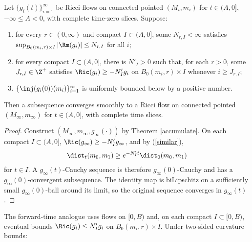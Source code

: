 \begin{corollary}
  \label{cor:kl-convergent-subsequences-ricci-flow-solutions-existence-convergent-subsequences-ricci-flow-solutions}
\label{accumulate2}

Let $\{g_i(t)\}_{i=1}^\infty$ be Ricci flows on connected pointed
$(M_i,m_i)$ for $t\in(A,0]$, $-\infty\leq A<0$, with complete time-zero
slices. Suppose:
\begin{enumerate}
\item for every $r\in(0,\infty)$ and compact $I\subset(A,0]$, some
$N_{r,I}<\infty$ satisfies
$\sup_{B_0(m_i,r)\times I}|\Rm(g_i)|\leq N_{r,I}$ for all $i$;
\item for every compact $I\subset(A,0]$, there is $N'_I>0$ such that, for
each $r>0$, some $J_{r,I}\in\Z^+$ satisfies
$\Ric(g_i)\geq-N'_Ig_i$ on $B_0(m_i,r)\times I$ whenever $i\geq J_{r,I}$;
\item $\{\inj(g_i(0))(m_i)\}_{i=1}^\infty$ is uniformly bounded below by a
positive number.
\end{enumerate}
Then a subsequence converges smoothly to a Ricci flow on connected pointed
$(M_\infty,m_\infty)$ for $t\in(A,0]$, with complete time slices.
\end{corollary}
\begin{proof}
\sketch
Construct $(M_\infty,m_\infty,g_\infty(\cdot))$ by Theorem
\ref{accumulate}. On each compact $I\subset(A,0]$,
$\Ric(g_\infty)\geq-N'_Ig_\infty$, and by (\ref{similar}),
\begin{equation} \label{similar2}
\dist_t(m_0,m_1)\geq e^{-N'_It}\dist_0(m_0,m_1)
\end{equation}
for $t\in I$. A $g_\infty(t)$-Cauchy sequence is therefore
$g_\infty(0)$-Cauchy and has a $g_\infty(0)$-convergent subsequence. The
identity map is biLipschitz on a sufficiently small $g_\infty(0)$-ball around
its limit, so the original sequence converges in $g_\infty(t)$.
\end{proof}

The forward-time analogue uses flows on $[0,B)$ and, on each compact
$I\subset[0,B)$, eventual bounds $\Ric(g_i)\leq N'_Ig_i$ on
$B_0(m_i,r)\times I$. Under two-sided curvature bounds:

